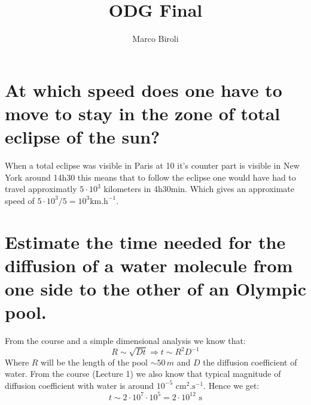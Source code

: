 \documentclass[10pt,a4paper]{article}
\author{Marco Biroli}
\title{ODG Final}
\begin{document}
\maketitle

\section{At which speed does one have to move to stay in the zone of total eclipse of the sun?}
When a total eclipse was visible in Paris at 10 it's counter part is visible in New York around 14h30 this means that to follow the eclipse one would have had to travel approximatly $5\cdot 10^{3}$ kilometers in 4h30min. Which gives an approximate speed of $5\cdot{10^3}/5 = 10^3 \text{km}.\text{h}^{-1}$.


\section{Estimate the time needed for the diffusion of a water molecule from one side to the other of an Olympic pool.}
From the course and a simple dimensional analysis we know that:
\[
R \sim \sqrt{D t} \Rightarrow t \sim R^2 D^{-1}
\]
Where $R$ will be the length of the pool $\sim 50 \,m$ and $D$ the diffusion coefficient of water. From the course (Lecture 1) we also know that typical magnitude of diffusion coefficient with water is around $10^{-5} \text{   cm}^2.\text{s}^{-1}$. Hence we get:
\[
t \sim 2 \cdot 10^7 \cdot 10^5 = 2 \cdot 10^{12} \text{ s}
\]
\end{document}
